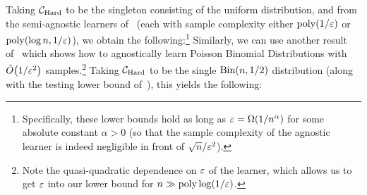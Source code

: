 Taking $\mathcal{C}_{\rm Hard}$ to be the singleton consisting of the uniform distribution, and from the semi-agnostic learners of~\cite{CDSS:13,CDSS:14} (each with sample complexity either $\operatorname*{poly}(1/\varepsilon)$ or $\operatorname*{poly}(\log n,1/\varepsilon)$), we obtain the following:\footnote{Specifically, these lower bounds hold as long as $\eps=\bigOmega{1/n^\alpha}$ for some absolute constant $\alpha > 0$ (so that the sample complexity of the agnostic learner is indeed negligible in front of $\sqrt{n}/\varepsilon^2$).}
\corolbsqrtn*
Similarly, we can use another result of~\cite{DDS:PBD:12} which shows how to agnostically learn Poisson Binomial Distributions with $\tildeO{1/\eps^2}$ samples.\footnote{Note the quasi-quadratic dependence on $\varepsilon$ of the learner, which allows us to get $\varepsilon$ into our lower bound for $n\gg \operatorname*{poly}\log(1/\varepsilon)$.} Taking $\mathcal{C}_{\rm Hard}$ to be the single $\operatorname{Bin}\!\left( n, 1/2 \right)$ distribution (along with the testing lower bound of~\cite{VV:14}), this yields the following:
\corolbpbd*

